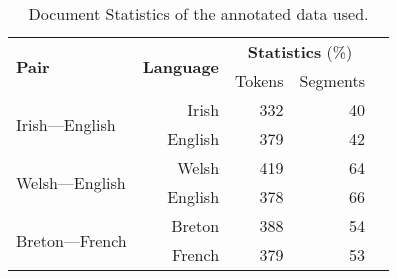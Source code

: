\documentclass[11pt]{article}
\begin{document}
\begin{table}
\begin{center}
\begin{tabular}{|l|r|r|r|r}
\hline
\multirow{2}{*}{\textbf{Pair}} & \multirow{2}{*}{\textbf{Language}}  & \multicolumn{2}{c|}{\textbf{Statistics} (\%)} \\\cline{3-4}
                &  &  Tokens & Segments \\
\hline
\multirow{2}{*}{Irish---English} & Irish & 332 & 40 \\
                                 & English & 379 & 42 \\
\hline
\multirow{2}{*}{Welsh---English} & Welsh & 419 & 64 \\
                                 & English & 378 & 66  \\
\hline
\multirow{2}{*}{Breton---French} & Breton & 388 & 54 \\
                                 & French & 379 & 53  \\
\hline
\end{tabular}
\end{center}
\label{table:accuracy}
\caption{Document Statistics of the annotated data used.}
\end{table}
\end{document}
